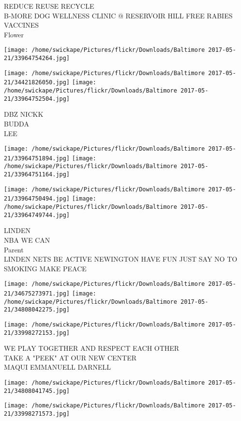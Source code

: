 \documentclass[10pt,letterpaper]{article}
\begin{document}
REDUCE REUSE RECYCLE\\
B{-}MORE DOG WELLNESS CLINIC @ RESERVOIR HILL FREE RABIES VACCINES\\
Flower
\pagebreak

\texttt{[image: /home/swickape/Pictures/flickr/Downloads/Baltimore 2017-05-21/33964754264.jpg]}

\vspace{0.25in}
\texttt{[image: /home/swickape/Pictures/flickr/Downloads/Baltimore 2017-05-21/34421826050.jpg]}
\texttt{[image: /home/swickape/Pictures/flickr/Downloads/Baltimore 2017-05-21/33964752504.jpg]}

DBZ NICKK\\
BUDDA\\
LEE
\pagebreak

\texttt{[image: /home/swickape/Pictures/flickr/Downloads/Baltimore 2017-05-21/33964751894.jpg]}
\texttt{[image: /home/swickape/Pictures/flickr/Downloads/Baltimore 2017-05-21/33964751164.jpg]}

\texttt{[image: /home/swickape/Pictures/flickr/Downloads/Baltimore 2017-05-21/33964750494.jpg]}
\texttt{[image: /home/swickape/Pictures/flickr/Downloads/Baltimore 2017-05-21/33964749744.jpg]}

LINDEN\\
NBA WE CAN\\
Parent\\
LINDEN NETS BE ACTIVE NEWINGTON HAVE FUN JUST SAY NO TO SMOKING MAKE PEACE
\pagebreak

\texttt{[image: /home/swickape/Pictures/flickr/Downloads/Baltimore 2017-05-21/34675273971.jpg]}
\texttt{[image: /home/swickape/Pictures/flickr/Downloads/Baltimore 2017-05-21/34808042275.jpg]}

\vspace{0.25in}
\texttt{[image: /home/swickape/Pictures/flickr/Downloads/Baltimore 2017-05-21/33998272153.jpg]}

WE PLAY TOGETHER AND RESPECT EACH OTHER\\
TAKE A "PEEK" AT OUR NEW CENTER\\
MAQUI EMMANUELL DARNELL
\pagebreak

\texttt{[image: /home/swickape/Pictures/flickr/Downloads/Baltimore 2017-05-21/34808041745.jpg]}

\vspace{0.25in}
\texttt{[image: /home/swickape/Pictures/flickr/Downloads/Baltimore 2017-05-21/33998271573.jpg]}
\end{document}
